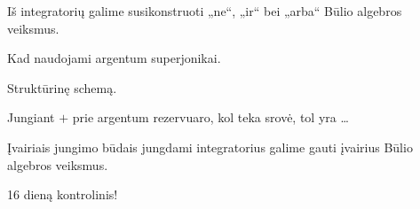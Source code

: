 Iš integratorių galime susikonstruoti „ne“, „ir“ bei
„arba“ Būlio algebros veiksmus.

\begin{remember}
  \item Kad naudojami argentum superjonikai.
  \item Struktūrinę schemą.
  \item Jungiant $+$ prie argentum rezervuaro, kol teka srovė, tol yra
    …
  \item Įvairiais jungimo būdais jungdami integratorius galime gauti
    įvairius Būlio algebros veiksmus.
\end{remember}

16 dieną kontrolinis!
